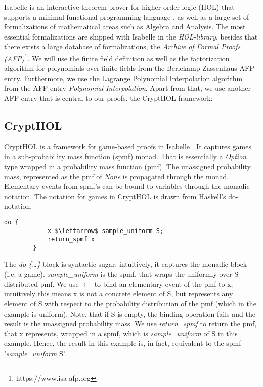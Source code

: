 Isabelle is an interactive theorem prover for higher-order logic (HOL) that supports a minimal functional programming language \parencite{isabelle_manual}, as well as a large set of formalizations of mathematical areas such as Algebra and Analysis. The most essential formalizations are shipped with Isabelle in the \textit{HOL-library}, besides that there exists a large database of formalizations, the \textit{Archive of Formal Proofs (AFP)}\footnote{https://www.isa-afp.org}. We will use the finite field definition as well as the factorization algorithm for polynomials over finite fields from the Berlekamp-Zassenhaus\parencite{Berlekamp_Zassenhaus-AFP} AFP entry. Furthermore, we use the Lagrange Polynomial Interpolation algorithm from the AFP entry \textit{Polynomial Interpolation}\parencite{Polynomial_Interpolation-AFP}.
Apart from that, we use another AFP entry that is central to our proofs, the CryptHOL framework\parencite{CryptHOL-AFP}:

\subsection*{CryptHOL}
CryptHOL is a framework for game-based proofs in Isabelle \parencite{CryptHOL_game_based}. It captures games in a sub-probability mass function (spmf) monad. That is essentially a \textit{Option} type wrapped in a probability mass function (pmf). The unassigned probability mass, represented as the pmf of \textit{None} is propagated through the monad.
Elementary events from spmf's can be bound to variables through the monadic notation. 
The notation for games in CryptHOL is drawn from Haskell's do-notation.  
\begin{example}
    \hspace{0mm}
    \begin{lstlisting}[language=isabelle]
        do {
            x $\leftarrow$ sample_uniform S;
            return_spmf x
        }
    \end{lstlisting}

    The \textit{do \{\dots\}} block is syntactic sugar, intuitively, it captures the monadic block (i.e. a game).
    \textit{sample\_uniform} is the spmf, that wraps the uniformly over S distributed pmf.
    We use $\leftarrow$ to bind an elementary event of the pmf to x, intuitively this means x is not a concrete element of S, but represents any element of S with respect to the probability distribution of the pmf (which in the example is uniform). Note, that if S is empty, the binding operation fails and the result is the unassigned probability mass. 
    We use \textit{return\_spmf} to return the pmf, that x represents, wrapped in a spmf, which is \textit{sample\_uniform} of S in this example. Hence, the result in this example is, in fact, equivalent to the spmf '\textit{sample\_uniform} S'.
\end{example}

